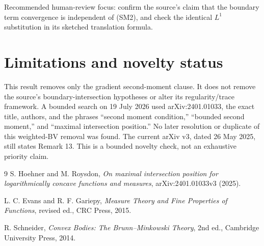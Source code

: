 \documentclass[11pt]{article}
\begin{document}
Recommended human-review focus: confirm the source's claim that the boundary
term convergence is independent of \textup{(SM2)}, and check the identical
$L^1$ substitution in its sketched translation formula.

\section{Limitations and novelty status}
This result removes only the gradient second-moment clause.  It does not remove
the source's boundary-intersection hypotheses or alter its regularity/trace
framework.  A bounded search on 19 July 2026 used arXiv:2401.01033, the exact
title, authors, and the phrases ``second moment condition,'' ``bounded second
moment,'' and ``maximal intersection position.''  No later resolution or
duplicate of this weighted-BV removal was found.  The current arXiv v3, dated
26 May 2025, still states Remark 13.  This is a bounded novelty check, not an
exhaustive priority claim.

\begin{thebibliography}{9}
S. Hoehner and M. Roysdon,
\emph{On maximal intersection position for logarithmically concave functions
and measures}, arXiv:2401.01033v3 (2025).

L. C. Evans and R. F. Gariepy,
\emph{Measure Theory and Fine Properties of Functions}, revised ed.,
CRC Press, 2015.

R. Schneider,
\emph{Convex Bodies: The Brunn--Minkowski Theory}, 2nd ed.,
Cambridge University Press, 2014.
\end{thebibliography}
\end{document}
